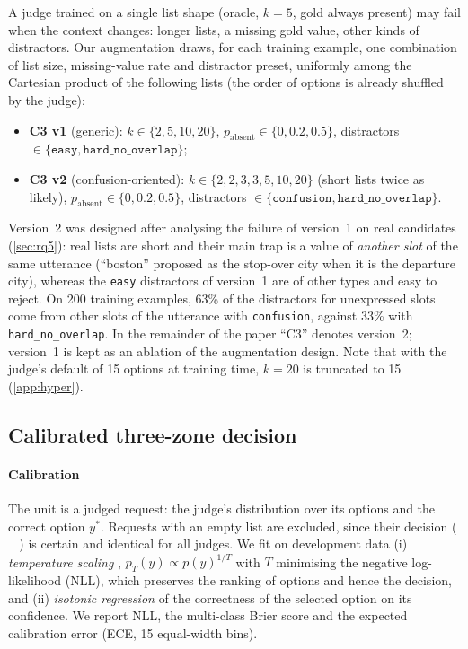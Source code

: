 A judge trained on a single list shape (oracle, $k=5$, gold always present) may fail when the context changes: longer lists, a missing gold value, other kinds of distractors. Our augmentation draws, for each training example, one combination of list size, missing-value rate and distractor preset, uniformly among the Cartesian product of the following lists (the order of options is already shuffled by the judge):
\begin{itemize}
  \item \textbf{C3 v1} (generic): $k\in\{2,5,10,20\}$, $p_{\text{absent}}\in\{0, 0.2, 0.5\}$, distractors $\in\{\texttt{easy},\texttt{hard\_no\_overlap}\}$;
  \item \textbf{C3 v2} (confusion-oriented): $k\in\{2,2,3,3,5,10,20\}$ (short lists twice as likely), $p_{\text{absent}}\in\{0, 0.2, 0.5\}$, distractors $\in\{\texttt{confusion},\texttt{hard\_no\_overlap}\}$.
\end{itemize}
Version~2 was designed after analysing the failure of version~1 on real candidates (\cref{sec:rq5}): real lists are short and their main trap is a value of \emph{another slot} of the same utterance (``boston'' proposed as the stop-over city when it is the departure city), whereas the \texttt{easy} distractors of version~1 are of other types and easy to reject. On 200 training examples, 63\% of the distractors for unexpressed slots come from other slots of the utterance with \texttt{confusion}, against 33\% with \texttt{hard\_no\_overlap}. In the remainder of the paper ``C3'' denotes version~2; version~1 is kept as an ablation of the augmentation design. Note that with the judge's default of 15 options at training time, $k=20$ is truncated to 15 (\cref{app:hyper}).

\subsection{Calibrated three-zone decision}
\label{sec:decision}

\paragraph{Calibration} The unit is a judged request: the judge's distribution over its options and the correct option $y^{*}$. Requests with an empty list are excluded, since their decision ($\bot$) is certain and identical for all judges. We fit on development data (i) \emph{temperature scaling} \citep{guo2017calibration}, $p_T(y) \propto p(y)^{1/T}$ with $T$ minimising the negative log-likelihood (NLL), which preserves the ranking of options and hence the decision, and (ii) \emph{isotonic regression} \citep{zadrozny2002transforming} of the correctness of the selected option on its confidence. We report NLL, the multi-class Brier score and the expected calibration error (ECE, 15 equal-width bins).


